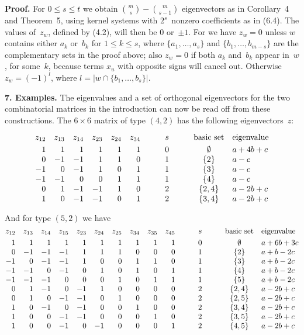 \noindent
{\bf Proof.}\quad
For $0\leq s\leq t$ we obtain ${m\choose s}-{m\choose s-1}$
eigenvectors as in Corollary~4 and Theorem~5, using kernel systems
with $2^s$~nonzero coefficients as in (6.4). The values of~$z_w$,
defined by (4.2), will then be 0 or~$\pm 1$. For we have $z_w=0$
unless $w$ contains either $a_k$ or~$b_k$ for $1\leq k\leq s$, where
$\{a_1,\ldots,a_s\}$ and $\{b_1,\ldots,b_{m-s}\}$ are the
complementary sets in the proof above; also $z_w=0$ if both $a_k$
and~$b_k$ appear in~$w$, for some~$k$, because terms $x_u$ with
opposite signs will cancel out. Otherwise $z_w=(-1)^l$, where $l=\vert
w\cap\{b_1,\ldots,b_s\}\vert$. \ \pfbox

\medskip\noindent
{\bf 7. Examples.}\quad
The eigenvalues and a set of orthogonal eigenvectors for the two
combinatorial matrices in the introduction can now be read off from
these constructions. The $6\times 6$ matrix of type $(4,2)$ has the
following eigenvectors~$z$:

$$\vcenter{\halign{%
\hfil$#$\quad
&\hfil$#$\quad&\hfil$#$\quad&\hfil$#$\quad&\hfil$#$\quad
&\hfil$#$\qquad\quad
&\hfil$#$\hfil\qquad\quad
&\hfil#\hfil\quad&#\hfil\cr
z_{12}&z_{13}&z_{14}&z_{23}&z_{24}&z_{34}&s&basic set&eigenvalue\cr
\noalign{\smallskip}
1&1&1&1&1&1&0&$\emptyset$&$a+4b+c$\cr
0&-1&-1&1&1&0&1&$\{2\}$&$a-c$\cr
-1&0&-1&1&0&1&1&$\{3\}$&$a-c$\cr
-1&-1&0&0&1&1&1&$\{4\}$&$a-c$\cr
0&1&-1&-1&1&0&2&$\{2,4\}$&$a-2b+c$\cr
1&0&-1&-1&0&1&2&$\{3,4\}$&$a-2b+c$\cr}}$$

And for type $(5,2)$ we have
$$\vcenter{\halign{%
\hfil$#$\quad
&\hfil$#$\quad&\hfil$#$\quad&\hfil$#$\quad&\hfil$#$\quad
&\hfil$#$\quad&\hfil$#$\quad&\hfil$#$\quad&\hfil$#$\quad
&\hfil$#$\qquad\quad
&\hfil$#$\hfil\qquad\quad
&\hfil#\hfil\quad&#\hfil\cr
z_{12}&z_{13}&z_{14}&z_{15}&z_{23}&z_{24}&z_{25}%
&z_{34}&z_{35}&z_{45}&s&basic set&eigenvalue\cr
\noalign{\smallskip}
1&1&1&1&1&1&1&1&1&1&0&$\emptyset$&$a+6b+3c$\cr
0&-1&-1&-1&1&1&1&0&0&0&1&$\{2\}$&$a+b-2c$\cr
-1&0&-1&-1&1&0&0&1&1&0&1&$\{3\}$&$a+b-2c$\cr
-1&-1&0&-1&0&1&0&1&0&1&1&$\{4\}$&$a+b-2c$\cr
-1&-1&-1&0&0&0&1&0&1&1&1&$\{5\}$&$a+b-2c$\cr
0&1&-1&0&-1&1&0&0&0&0&2&$\{2,4\}$&$a-2b+c$\cr
0&1&0&-1&-1&0&1&0&0&0&2&$\{2,5\}$&$a-2b+c$\cr
1&0&-1&0&-1&0&0&1&0&0&2&$\{3,4\}$&$a-2b+c$\cr
1&0&0&-1&-1&0&0&0&1&0&2&$\{3,5\}$&$a-2b+c$\cr
1&0&0&-1&0&-1&0&0&0&1&2&$\{4,5\}$&$a-2b+c$\cr}}$$

